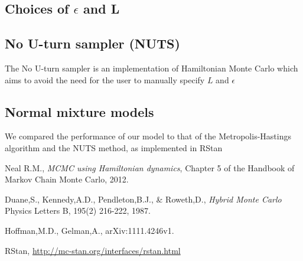 \documentclass[11pt]{article}
\begin{document}
\subsection{Choices of $\epsilon$ and L}


\subsection{No U-turn sampler (NUTS)}
The No U-turn sampler\cite{NUTS} is an implementation of Hamiltonian Monte Carlo which aims to avoid the need for the user to manually specify $L$ and $\epsilon$
\cite{rstan}
\subsection{Normal mixture models}
We compared the performance of our model to that of the Metropolis-Hastings algorithm and the NUTS method, as implemented in RStan

\begin{thebibliography}{9}

  Neal R.M.,
  \emph{MCMC using Hamiltonian dynamics},
  Chapter 5 of the Handbook of Markov Chain Monte Carlo,
  2012.
  
  Duane,S., Kennedy,A.D., Pendleton,B.J., \& Roweth,D.,
  \emph{Hybrid Monte Carlo }
  Physics Letters B, 195(2) 216-222, 1987.

  Hoffman,M.D., Gelman,A.,
  arXiv:1111.4246v1.
  
  RStan, \url{http://mc-stan.org/interfaces/rstan.html}

\end{thebibliography}
\end{document}
